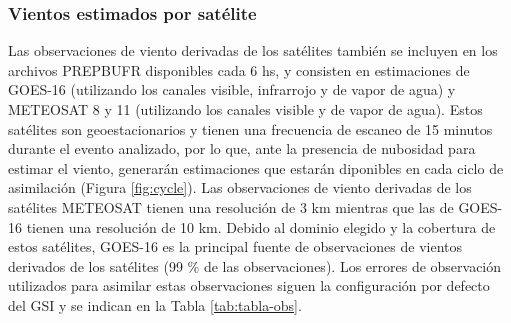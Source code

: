 \documentclass[12pt,oneside,a4paper]{reedthesis}
\begin{document}
\hypertarget{vientos-estimados-por-satuxe9lite}{%
\subsubsection{Vientos estimados por satélite}\label{vientos-estimados-por-satuxe9lite}}

Las observaciones de viento derivadas de los satélites también se incluyen en los archivos PREPBUFR disponibles cada 6 hs, y consisten en estimaciones de GOES-16 (utilizando los canales visible, infrarrojo y de vapor de agua) y METEOSAT 8 y 11 (utilizando los canales visible y de vapor de agua). Estos satélites son geoestacionarios y tienen una frecuencia de escaneo de 15 minutos durante el evento analizado, por lo que, ante la presencia de nubosidad para estimar el viento, generarán estimaciones que estarán diponibles en cada ciclo de asimilación (Figura \ref{fig:cycle}). Las observaciones de viento derivadas de los satélites METEOSAT tienen una resolución de 3 km mientras que las de GOES-16 tienen una resolución de 10 km. Debido al dominio elegido y la cobertura de estos satélites, GOES-16 es la principal fuente de observaciones de vientos derivados de los satélites (99 \% de las observaciones). Los errores de observación utilizados para asimilar estas observaciones siguen la configuración por defecto del GSI y se indican en la Tabla \ref{tab:tabla-obs}.
\end{document}
